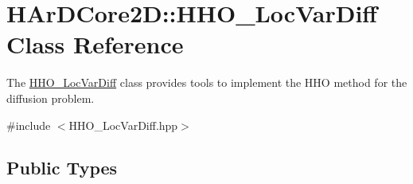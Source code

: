 \hypertarget{classHArDCore2D_1_1HHO__LocVarDiff}{}\section{H\+Ar\+D\+Core2D\+:\+:H\+H\+O\+\_\+\+Loc\+Var\+Diff Class Reference}
\label{classHArDCore2D_1_1HHO__LocVarDiff}


The \hyperlink{classHArDCore2D_1_1HHO__LocVarDiff}{H\+H\+O\+\_\+\+Loc\+Var\+Diff} class provides tools to implement the H\+HO method for the diffusion problem.  




{\ttfamily \#include $<$H\+H\+O\+\_\+\+Loc\+Var\+Diff.\+hpp$>$}

\subsection*{Public Types}
